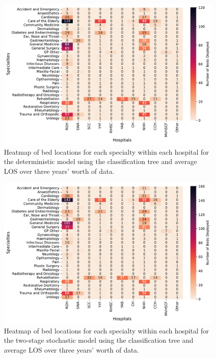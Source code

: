\documentclass[thesis.tex]{subfiles}
\begin{document}
\begin{figure}[h!]
    \centering
    \includegraphics[scale=0.55]{Figures - Heatmaps/Fig23.pdf}
\caption{Heatmap of bed locations for each specialty within each hospital for the deterministic model using the classification tree and average LOS over three years' worth of data.}
    \label{fig:app14a}
\end{figure}
\begin{figure}[h!]
    \centering
    \includegraphics[scale=0.55]{Figures - Heatmaps/Fig24.pdf}
    \caption{Heatmap of bed locations for each specialty within each hospital for the two-stage stochastic model using the classification tree and average LOS over three years' worth of data.}
    \label{fig:app14b}
\end{figure}
\end{document}
